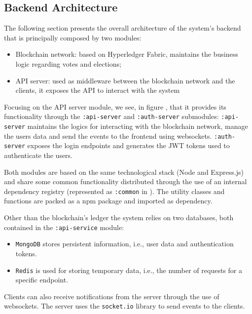 \documentclass{scrartcl}
\begin{document}
\subsection{Backend Architecture}
The following section presents the overall architecture of the system's backend that is principally composed  by two modules:
\begin{itemize}
    \item Blockchain network: based on Hyperledger Fabric, maintains the business logic regarding votes and elections;
    \item API server: used as middleware between the blockchain network and the clients, it exposes the API to interact with the system
\end{itemize}

Focusing on the API server module, we see, in figure , that it provides its functionality through the \texttt{:api-server} and \texttt{:auth-server} submodules: \texttt{:api-server} maintains the logics for interacting with the blockchain network, manage the users data and send the events to the frontend using websockets. \texttt{:auth-server} exposes the login endpoints and generates the JWT tokens used to authenticate the users.

Both modules are based on the same technological stack (Node and Express.js) and share some common functionality distributed through the use of an internal dependency registry (represented as \texttt{:common} in ). The utility classes and functions are packed as a npm package and imported as dependency.

Other than the blockchain's ledger the system relies on two databases, both contained in the \texttt{:api-service} module:
\begin{itemize}
    \item \texttt{MongoDB} stores persistent information, i.e., user data and authentication tokens.
    \item \texttt{Redis} is used for storing temporary data, i.e., the number of requests for a specific endpoint.
\end{itemize}

Clients can also receive notifications from the server through the use of websockets. The server uses the \texttt{socket.io} library to send events to the clients.
\end{document}
